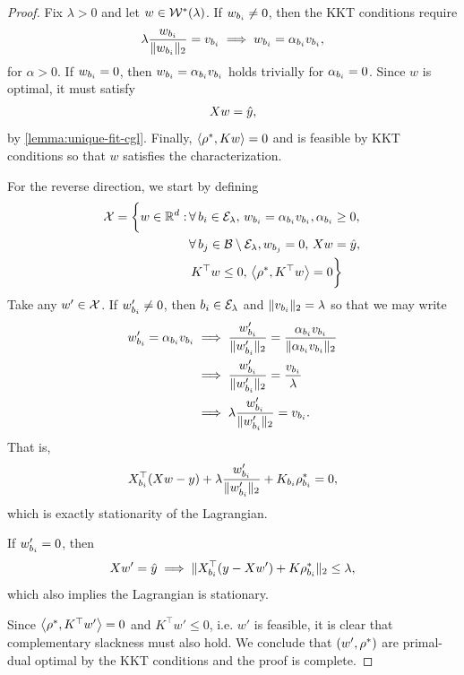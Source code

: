 \begin{proof}
	Fix \( \lambda > 0 \) and let
	\( w \in \mathcal{W}^*(\lambda) \).
	If \( w_{b_i} \neq 0 \), then the KKT conditions require
	\[
		\lambda \frac{w_{b_i}}{\|w_{b_i}\|_2} = v_{b_i} \implies w_{b_i} = \alpha_{b_i} v_{b_i},
	\]
	for \( \alpha > 0 \).
	If \( w_{b_i} = 0 \), then \( w_{b_i} = \alpha_{b_i} v_{b_i} \) holds trivially for
	\( \alpha_{b_i} = 0 \).
	Since \( w \) is optimal, it must satisfy
	\[
		X w = \hat y,
	\]
	by \cref{lemma:unique-fit-cgl}.
	Finally, \( \left\langle\rho^*, K w\right\rangle = 0 \) and is feasible by KKT conditions
	so that \( w \) satisfies the characterization.

	For the reverse direction, we start by defining
	\[
		\begin{aligned}
			\mathcal{X} =
			\bigg\{ w \in \mathbb{R}^d : \,
			 & \forall \, {b_i} \in {\mathcal{E}_{\lambda}}, \,
			w_{b_i} = \alpha_{b_i} v_{b_i}, \alpha_{b_i} \geq 0, \,                   \\
			 & \forall \, b_j \in \mathcal{B} \setminus {\mathcal{E}_{\lambda}}, w_{b_j} = 0, \,
			X w = \hat y,                                                 \\
			 & \, K^\top w \leq 0, \,
			\left\langle\rho^*, K^\top w\right\rangle = 0
			\bigg\}
		\end{aligned}
	\]
	Take any \( w' \in \mathcal{X} \).
	If \( w_{b_i}' \neq 0 \), then \( {b_i} \in {\mathcal{E}_{\lambda}} \) and \( \|v_{b_i}\|_2 = \lambda \)
	so that we may write
	\begin{align*}
		w_{b_i}' = \alpha_{b_i} v_{b_i}
		 & \implies \frac{w_{b_i}'}{\|w_{b_i}'\|_2} = \frac{\alpha_{b_i} v_{b_i}}{\|\alpha_{b_i} v_{b_i}\|_2} \\
		 & \implies \frac{w_{b_i}'}{\|w_{b_i}'\|_2} = \frac{v_{b_i}}{\lambda}                            \\
		 & \implies \lambda \frac{w_{b_i}'}{\|w_{b_i}'\|_2} = v_{b_i}.
	\end{align*}
	That is,
	\[
		X_{b_i}^\top (Xw - y) + \lambda \frac{w_{b_i}'}{\|w_{b_i}'\|_2} + K_{{b_i}} \rho^*_{b_i} = 0,
	\]
	which is exactly stationarity of the Lagrangian.

	If \( w_{b_i}' = 0 \), then
	\[
		X w' = \hat y \implies \|X_{b_i}^\top (y - Xw') + K \rho^*_{b_i}\|_2 \leq \lambda,
	\]
	which also implies the Lagrangian is stationary.

	Since \( \left\langle\rho^*, K^\top w'\right\rangle = 0 \) and
	\( K^\top w' \leq 0 \), i.e. \( w' \) is feasible,
	it is clear that complementary slackness must also hold.
	We conclude that \( (w', \rho^*) \) are primal-dual optimal by the KKT
	conditions and the proof is complete.
\end{proof}


